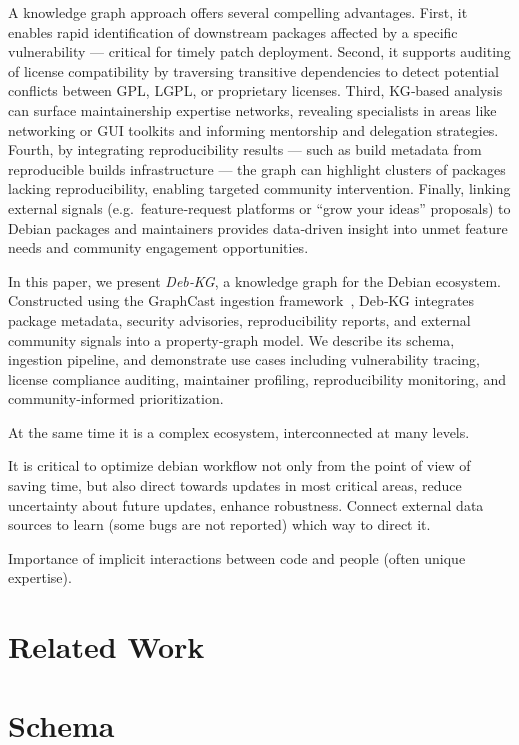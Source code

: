 \documentclass[11pt,oneside,a4paper]{article}
\begin{document}
    A knowledge graph approach offers several compelling advantages.
    First, it enables rapid identification of downstream packages affected by a specific vulnerability — critical for timely patch deployment.
    Second, it supports auditing of license compatibility by traversing transitive dependencies to detect potential conflicts between GPL, LGPL, or proprietary licenses.
    Third, KG‑based analysis can surface maintainership expertise networks, revealing specialists in areas like networking or GUI toolkits and informing mentorship and delegation strategies.
    Fourth, by integrating reproducibility results — such as build metadata from reproducible builds infrastructure — the graph can highlight clusters of packages lacking reproducibility, enabling targeted community intervention.
    Finally, linking external signals (e.g.\ feature‑request platforms or “grow your ideas” proposals) to Debian packages and maintainers provides data‑driven insight into unmet feature needs and community engagement opportunities.

    In this paper, we present \emph{Deb‑KG}, a knowledge graph for the Debian ecosystem.
    Constructed using the GraphCast ingestion framework~\cite{graphcast}, Deb‑KG integrates package metadata, security advisories, reproducibility reports, and external community signals into a property‑graph model.
    We describe its schema, ingestion pipeline, and demonstrate use cases including vulnerability tracing, license compliance auditing, maintainer profiling, reproducibility monitoring, and community‑informed prioritization.

    At the same time it is a complex ecosystem, interconnected at many levels.

    It is critical to optimize debian workflow not only from the point of view of saving time, but also direct towards updates in most critical areas, reduce uncertainty about future updates, enhance robustness.
    Connect external data sources to learn (some bugs are not reported) which way to direct it.


    Importance of implicit interactions between code and people (often unique expertise).


    \section{Related Work}


    \section{Schema}
\end{document}
